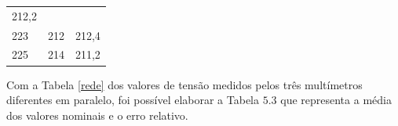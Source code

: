 \documentclass[14pt, oneside]{book}
\newcommand\tab[1][1cm]{\hspace*{#1}}
\theoremstyle{definition}
\begin{document}
\begin{table}[H]
{\begin{tabular}{ l l l }
                            \multicolumn{1}{p{4.217cm}|}{212,2 \centering }
                      \\
                        \cline{1-1}\cline{2-2}\cline{3-3}  
                            \multicolumn{1}{|p{3.033cm}|}{223 \centering } &
                            \multicolumn{1}{p{2.267cm}|}{212 \centering } &
                            \multicolumn{1}{p{4.217cm}|}{212,4 \centering }
                        \\
                      \cline{1-1}\cline{2-2}\cline{3-3}  
                            \multicolumn{1}{|p{3.033cm}|}{225 \centering } &
                            \multicolumn{1}{p{2.267cm}|}{214 \centering } &
                            \multicolumn{1}{p{4.217cm}|}{211,2 \centering }
                            \\
                        \hline
                    
                    \end{tabular} }
                \end{table}
                \tab Com a Tabela \ref{rede} dos valores de tensão medidos pelos três multímetros diferentes em paralelo, foi possível elaborar a Tabela $5.3$ que representa a média dos valores nominais e o erro relativo.
                
\end{document}
